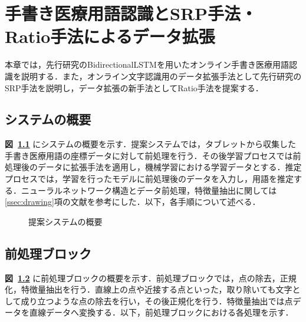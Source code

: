 
\chapter{手書き医療用語認識とSRP手法・Ratio手法によるデータ拡張}
\label{cha:propose}
本章では，先行研究\cite{takahashi}のBidirectionalLSTMを用いたオンライン手書き医療用語認識を説明する．また，オンライン文字認識用のデータ拡張手法として先行研究のSRP手法を説明し，データ拡張の新手法としてRatio手法を提案する．
\section{システムの概要}
\label{sec:concept}
\textbf{図~\ref{sys_concept}} にシステムの概要を示す．提案システムでは，タブレットから収集した手書き医療用語の座標データに対して前処理を行う．その後学習プロセスでは前処理後のデータに拡張手法を適用し，機械学習における学習データとする．推定プロセスでは，学習を行ったモデルに前処理後のデータを入力し，用語を推定する．ニューラルネットワーク構造とデータ前処理，特徴量抽出に関しては\ref{ssec:drawing}項の文献\cite{takahashi}を参考にした．以下，各手順について述べる．

\begin{figure}[tb]
 \begin{center}
  \caption{提案システムの概要}
  \label{sys_concept}
\end{center}
\end{figure}

\section{前処理ブロック}
\label{preprocess}
\textbf{図~\ref{preprocess}} に前処理ブロックの概要を示す．前処理ブロックでは，点の除去，正規化，特徴量抽出を行う．直線上の点や近接する点といった，取り除いても文字として成り立つような点の除去を行い，その後正規化を行う．特徴量抽出では点データを直線データへ変換する．以下，前処理ブロックにおける各処理を示す．

